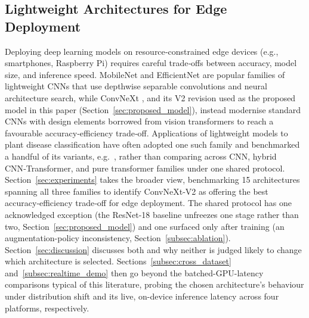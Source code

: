 \subsection{Lightweight Architectures for Edge Deployment}
Deploying deep learning models on resource‑constrained edge devices (e.g., smartphones, Raspberry Pi) requires careful trade‑offs between accuracy, model size, and inference speed. MobileNet \citep{howard2017mobilenets} and EfficientNet \citep{tan2019efficientnet} are popular families of lightweight CNNs that use depthwise separable convolutions and neural architecture search, while ConvNeXt \citep{liu2022convnet}, and its V2 revision \citep{woo2023convnextv2} used as the proposed model in this paper (Section~\ref{sec:proposed_model}), instead modernise standard CNNs with design elements borrowed from vision transformers to reach a favourable accuracy‑efficiency trade‑off. Applications of lightweight models to plant disease classification have often adopted one such family and benchmarked a handful of its variants, e.g.\ \citep{atila2021plant}, rather than comparing across CNN, hybrid CNN‑Transformer, and pure transformer families under one shared protocol. Section~\ref{sec:experiments} takes the broader view, benchmarking 15 architectures spanning all three families to identify ConvNeXt‑V2 as offering the best accuracy‑efficiency trade‑off for edge deployment. The shared protocol has one acknowledged exception (the ResNet-18 baseline unfreezes one stage rather than two, Section~\ref{sec:proposed_model}) and one surfaced only after training (an augmentation-policy inconsistency, Section~\ref{subsec:ablation}). Section~\ref{sec:discussion} discusses both and why neither is judged likely to change which architecture is selected. Sections~\ref{subsec:cross_dataset} and~\ref{subsec:realtime_demo} then go beyond the batched-GPU-latency comparisons typical of this literature, probing the chosen architecture's behaviour under distribution shift and its live, on-device inference latency across four platforms, respectively.

